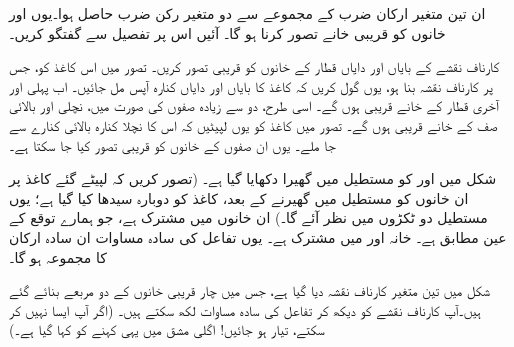 ان  تین متغیر ارکان ضرب کے مجموعے سے دو متغیر رکن ضرب حاصل ہوا۔یوں    اور  خانوں کو قریبی خانے  تصور کرنا ہو گا۔  آئیں  اس پر تفصیل سے گفتگو کریں۔

کارناف نقشے کے    بایاں اور دایاں  قطار کے خانوں کو قریبی تصور کریں۔ تصور میں اس  کاغذ کو، جس پر کارناف نقشہ بنا ہو،  یوں گول کریں کہ کاغذ کا بایاں اور دایاں کنارہ آپس   مل جائیں۔ اب پہلی اور آخری قطار کے خانے  قریبی ہوں گے۔ اسی طرح، دو سے زیادہ  صفوں کی صورت میں،   نچلی اور بالائی صف کے خانے قریبی ہوں گے۔ تصور میں کاغذ کو یوں لپیٹیں کہ اس کا نچلا کنارہ بالائی کنارے سے جا ملے۔ یوں ان صفوں کے خانوں کو قریبی تصور کیا جا سکتا ہے۔ 
	
شکل    میں  اور    کو مستطیل میں گھیرا دکھایا گیا ہے۔ (تصور کریں کہ لپیٹے  گئے کاغذ پر ان خانوں کو مستطیل میں گھیرنے کے بعد، کاغذ کو دوبارہ سیدھا کیا گیا ہے؛ یوں مستطیل  دو ٹکڑوں میں نظر آئے گا۔) ان خانوں میں  مشترک ہے، جو ہمارے  توقع کے عین مطابق ہے۔   خانہ   اور   میں  مشترک ہے۔ یوں تفاعل کی سادہ مساوات ان سادہ ارکان کا مجموعہ  ہو گا۔


شکل  میں تین متغیر  کارناف نقشہ دیا گیا ہے،  جس میں چار قریبی خانوں کے دو  مربعے  بنائے گئے ہیں۔آپ کارناف نقشے کو دیکھ کر  تفاعل کی سادہ مساوات  لکھ سکتے  ہیں۔ (اگر آپ ایسا نہیں کر سکتے،  تیار ہو جائیں!  اگلی  مشق میں یہی کہنے کو کہا گیا ہے۔)

